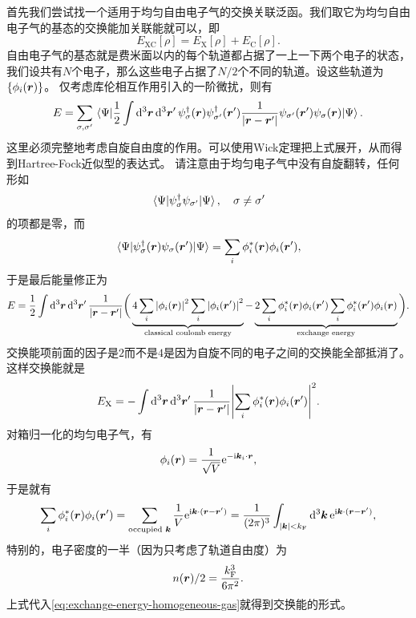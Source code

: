 首先我们尝试找一个适用于均匀自由电子气的交换关联泛函。我们取它为均匀自由电子气的基态的交换能加关联能就可以，即
\begin{equation}
    E_\text{XC}[\rho] = E_\text{X}[\rho] + E_\text{C}[\rho].
\end{equation}
自由电子气的基态就是费米面以内的每个轨道都占据了一上一下两个电子的状态，我们设共有$N$个电子，那么这些电子占据了$N/2$个不同的轨道。设这些轨道为$\{\phi_i(\vb*{r})\}$。
仅考虑库伦相互作用引入的一阶微扰，则有
\[
    E = \sum_{\sigma, \sigma'} \mel{\Psi}{
        \frac{1}{2} \int \dd[3]{\vb*{r}} \dd[3]{\vb*{r}'} {\psi}^\dagger_{\sigma}(\vb*{r}) {\psi}^\dagger_{\sigma'}(\vb*{r}') \frac{1}{\abs{\vb*{r} - \vb*{r}'}} {\psi}_{\sigma'}(\vb*{r}') {\psi}_\sigma(\vb*{r})
    }{\Psi}.
\]
这里必须完整地考虑自旋自由度的作用。可以使用Wick定理把上式展开，从而得到Hartree-Fock近似型的表达式。
请注意由于均匀电子气中没有自旋翻转，任何形如
\[
    \mel{\Psi}{{\psi}_\sigma^\dagger {\psi}_{\sigma'}}{\Psi}, \quad \sigma \neq \sigma'
\]
的项都是零，而
\[
    \mel{\Psi}{{\psi}^\dagger_\sigma(\vb*{r}) {\psi}_{\sigma}(\vb*{r}')}{\Psi} = \sum_i \phi_i^*(\vb*{r}) \phi_i(\vb*{r}'),
\]
于是最后能量修正为
\[
    E = \frac{1}{2} \int \dd[3]{\vb*{r}} \dd[3]{\vb*{r}'} \frac{1}{\abs{\vb*{r} - \vb*{r}'}} \bigg(
        \underbrace{4 \sum_{i} \abs{\phi_i(\vb*{r})}^2 \sum_{i} \abs{\phi_i(\vb*{r}')}^2}_\text{classical coulomb energy} - \underbrace{2 \sum_i \phi_i^*(\vb*{r}) \phi_i(\vb*{r}') \sum_i \phi_i^*(\vb*{r}') \phi_i(\vb*{r})}_\text{exchange energy}
    \bigg).
\]
交换能项前面的因子是$2$而不是$4$是因为自旋不同的电子之间的交换能全部抵消了。这样交换能就是
\begin{equation}
    E_\text{X} = - \int \dd[3]{\vb*{r}} \dd[3]{\vb*{r}'} \frac{1}{\abs{\vb*{r} - \vb*{r}'}} \abs{\sum_i \phi_i^*(\vb*{r}) \phi_i(\vb*{r}')}^2 . 
    \label{eq:exchange-energy-homogeneous-gas}
\end{equation}
对箱归一化的均匀电子气，有
\[
    \phi_i(\vb*{r}) = \frac{1}{\sqrt{V}} \mathrm{e}^{- \mathrm{i} \vb*{k}_i \cdot \vb*{r}},
\]
于是就有
\begin{equation}
    \sum_i \phi_i^*(\vb*{r}) \phi_i(\vb*{r}') = \sum_{\text{occupied $\vb*{k}$}} \frac{1}{V} \mathrm{e}^{\mathrm{i} \vb*{k} \cdot (\vb*{r} - \vb*{r}')} = \frac{1}{(2\pi)^3} \int_{\abs{\vb*{k}} < k_\text{F}} \dd[3]{\vb*{k}} \mathrm{e}^{\mathrm{i} \vb*{k} \cdot (\vb*{r} - \vb*{r}')},
    \label{eq:homogeneous-density}
\end{equation}
特别的，电子密度的一半（因为只考虑了轨道自由度）为
\[
    n(\vb*{r}) / 2 = \frac{k_\text{F}^3}{6 \pi^2}.
\]
上式代入\eqref{eq:exchange-energy-homogeneous-gas}就得到交换能的形式。
